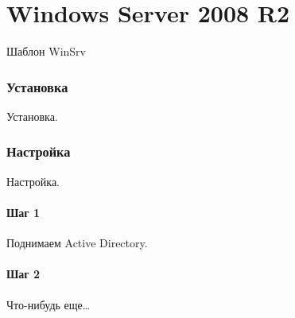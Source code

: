 \part{Windows Server 2008 R2}
Шаблон WinSrv

\section{Установка}
Установка.

\section{Настройка}
Настройка.

\subsection{Шаг 1}
Поднимаем Active Directory.

\subsection{Шаг 2}
Что-нибудь еще\ldots